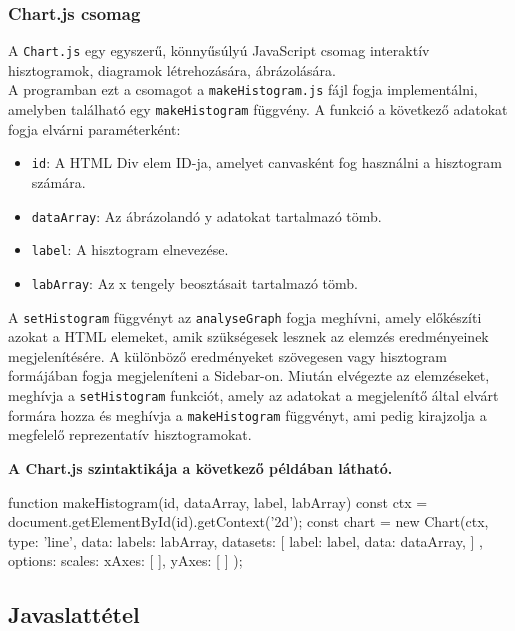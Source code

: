 \subsubsection{Chart.js csomag}

A \texttt{Chart.js} egy egyszerű, könnyűsúlyú JavaScript csomag interaktív hisztogramok, diagramok létrehozására, ábrázolására.\\

A programban ezt a csomagot a \texttt{makeHistogram.js} fájl fogja implementálni, amelyben található egy \texttt{makeHistogram} függvény. A funkció a következő adatokat fogja elvárni paraméterként: 

\begin{itemize}
	\item \texttt{id}: A HTML Div elem ID-ja, amelyet canvasként fog használni a hisztogram számára.
	\item \texttt{dataArray}: Az ábrázolandó y adatokat tartalmazó tömb.
	\item \texttt{label}: A hisztogram elnevezése.
	\item \texttt{labArray}: Az x tengely beosztásait tartalmazó tömb.
\end{itemize} 

A \texttt{setHistogram} függvényt az \texttt{analyseGraph} fogja meghívni, amely előkészíti azokat a HTML elemeket, amik szükségesek lesznek az elemzés eredményeinek megjelenítésére. A különböző eredményeket szövegesen vagy hisztogram formájában fogja megjeleníteni a Sidebar-on. Miután elvégezte az elemzéseket, meghívja a \texttt{setHistogram} funkciót, amely az adatokat a megjelenítő által elvárt formára hozza és meghívja a \texttt{makeHistogram} függvényt, ami pedig kirajzolja a megfelelő reprezentatív hisztogramokat. 

\pagebreak
 
\noindent\textbf{A Chart.js szintaktikája a következő példában látható.}
 
\begin{js}
function makeHistogram(id, dataArray, label, labArray){
  const ctx = document.getElementById(id).getContext('2d');
  const chart = new Chart(ctx, {
    type: 'line',
    data: {
      labels: labArray,
      datasets: [{
        label: label,
        data: dataArray,
      }]
    },
    options: {
      scales: {
        xAxes: [{
        }],
        yAxes: [{
        }]
      }
    }
  });
}	
\end{js}

\subsection{Javaslattétel}

